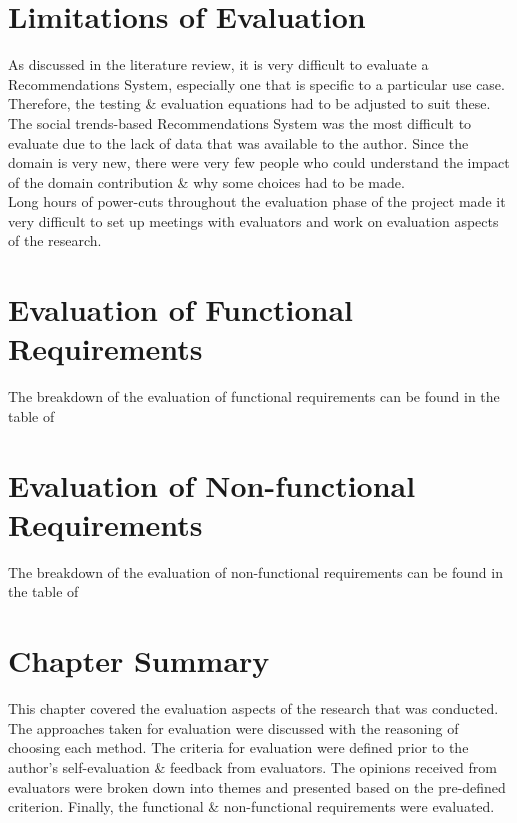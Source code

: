 
\section{Limitations of Evaluation}
As discussed in the literature review, it is very difficult to evaluate a Recommendations System, especially one that is specific to a particular use case. Therefore, the testing \& evaluation equations had to be adjusted to suit these.
The social trends-based Recommendations System was the most difficult to evaluate due to the lack of data that was available to the author.
Since the domain is very new, there were very few people who could understand the impact of the domain contribution \& why some choices had to be made.\\
Long hours of power-cuts throughout the evaluation phase of the project made it very difficult to set up meetings with evaluators and work on evaluation aspects of the research.

\section{Evaluation of Functional Requirements}
The breakdown of the evaluation of functional requirements can be found in the table  of \textbf{}

\section{Evaluation of Non-functional Requirements}
The breakdown of the evaluation of non-functional requirements can be found in the table  of \textbf{}

\section{Chapter Summary}
This chapter covered the evaluation aspects of the research that was conducted. The approaches taken for evaluation were discussed with the reasoning of choosing each method. The criteria for evaluation were defined prior to the author's self-evaluation \& feedback from evaluators. The opinions received from evaluators were broken down into themes and presented based on the pre-defined criterion. Finally, the functional \& non-functional requirements were evaluated.